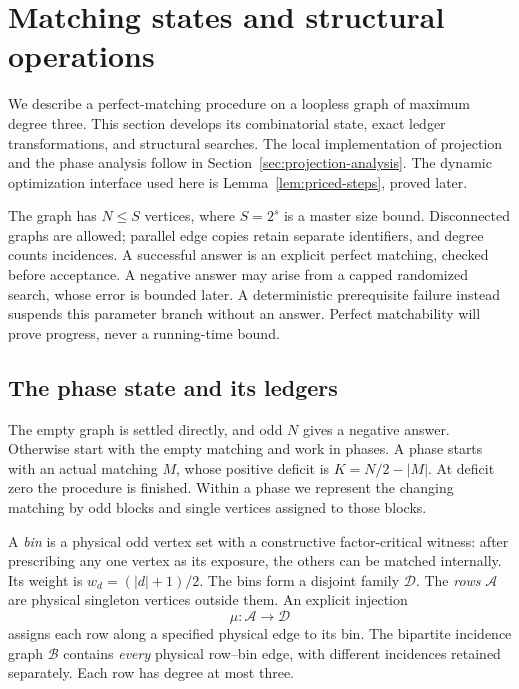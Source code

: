 \section{Matching states and structural operations}
\label{sec:matching-state}

We describe a perfect-matching procedure on a loopless graph of maximum
degree three.  This section develops its combinatorial state, exact
ledger transformations, and structural searches.  The local implementation
of projection and the phase analysis follow in
Section~\ref{sec:projection-analysis}.  The dynamic optimization interface
used here is Lemma~\ref{lem:priced-steps}, proved later.

The graph has \(N\le S\) vertices, where \(S=2^s\) is a master size bound.
Disconnected graphs are allowed; parallel edge copies retain separate
identifiers, and degree counts incidences.  A successful answer is an
explicit perfect matching, checked before acceptance.  A negative answer
may arise from a capped randomized search, whose error is bounded later.
A deterministic prerequisite failure instead suspends this parameter
branch without an answer.  Perfect matchability will prove progress,
never a running-time bound.

\subsection{The phase state and its ledgers}
\label{match:parameters}

The empty graph is settled directly, and odd \(N\) gives a negative
answer.  Otherwise start with the empty matching and work in phases.
A phase starts with an actual matching \(M\), whose positive deficit
is \(K=N/2-|M|\).  At deficit zero the procedure is finished.
Within a phase we represent the changing matching by odd blocks and
single vertices assigned to those blocks.

A \emph{bin} is a physical odd vertex set with a constructive
factor-critical witness: after prescribing any one vertex as its
exposure, the others can be matched internally.  Its weight is
\(w_d=(|d|+1)/2\).  The bins form a disjoint family \(\mathcal D\).
The \emph{rows} \(\mathcal A\) are physical singleton vertices outside
them.  An explicit injection
\[
                         \mu:\mathcal A\longrightarrow\mathcal D
\]
assigns each row along a specified physical edge to its bin.
The bipartite incidence graph \(\mathcal B\) contains \emph{every}
physical row--bin edge, with different incidences retained separately.
Each row has degree at most three.

